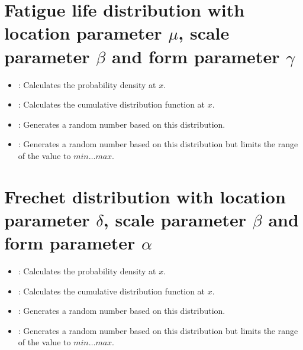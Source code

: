 \section{Fatigue life distribution with location parameter \texorpdfstring{$\mu$}{mu}, scale parameter \texorpdfstring{$\beta$}{beta} and form parameter \texorpdfstring{$\gamma$}{gamma}}

\begin{itemize}

\item
{}:
Calculates the probability density at $x$.

\item
{}:
Calculates the cumulative distribution function at $x$.

\item
{}:
Generates a random number based on this distribution.

\item
{}:
Generates a random number based on this distribution but limits the range of the value to $min\ldots max$.

\end{itemize}



\section{Frechet distribution with location parameter \texorpdfstring{$\delta$}{delta}, scale parameter \texorpdfstring{$\beta$}{beta} and form parameter \texorpdfstring{$\alpha$}{alpha}}

\begin{itemize}

\item
{}:
Calculates the probability density at $x$.

\item
{}:
Calculates the cumulative distribution function at $x$.

\item
{}:
Generates a random number based on this distribution.

\item
{}:
Generates a random number based on this distribution but limits the range of the value to $min\ldots max$.

\end{itemize}



